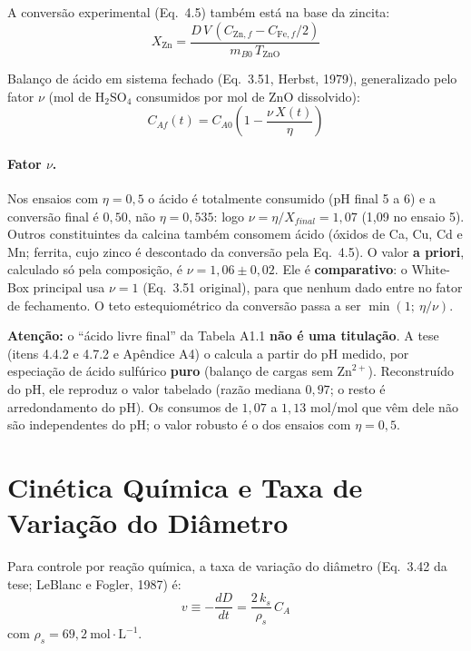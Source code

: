 \documentclass[12pt,a4paper]{article}
\begin{document}
A conversão experimental (Eq.~4.5) também está na base da zincita:
\begin{equation}
    X_{\text{Zn}} = \frac{D \, V \, (C_{\text{Zn},f} - C_{\text{Fe},f}/2)}{m_{B0} \, T_{\text{ZnO}}}
\end{equation}

Balanço de ácido em sistema fechado (Eq.~3.51, Herbst, 1979), generalizado pelo fator $\nu$ (mol de $\text{H}_2\text{SO}_4$ consumidos por mol de ZnO dissolvido):
\begin{equation}
    C_{Af}(t) = C_{A0} \left( 1 - \frac{\nu \, X(t)}{\eta} \right)
    \label{eq:consumo_acido}
\end{equation}

\paragraph{Fator $\nu$.}\label{sec:nu} Nos ensaios com $\eta = 0{,}5$ o ácido é totalmente consumido (pH final 5 a 6) e a conversão final é $0{,}50$, não $\eta = 0{,}535$: logo $\nu = \eta/X_{final} = 1{,}07$ (1,09 no ensaio 5). Outros constituintes da calcina também consomem ácido (óxidos de Ca, Cu, Cd e Mn; ferrita, cujo zinco é descontado da conversão pela Eq.~4.5). O valor \textbf{a priori}, calculado só pela composição, é $\nu = 1{,}06 \pm 0{,}02$. Ele é \textbf{comparativo}: o White-Box principal usa $\nu = 1$ (Eq.~3.51 original), para que nenhum dado entre no fator de fechamento. O teto estequiométrico da conversão passa a ser $\min(1;\ \eta/\nu)$.

\textbf{Atenção:} o ``ácido livre final'' da Tabela A1.1 \textbf{não é uma titulação}. A tese (itens 4.4.2 e 4.7.2 e Apêndice A4) o calcula a partir do pH medido, por especiação de ácido sulfúrico \textbf{puro} (balanço de cargas sem $\text{Zn}^{2+}$). Reconstruído do pH, ele reproduz o valor tabelado (razão mediana $0{,}97$; o resto é arredondamento do pH). Os consumos de $1{,}07$ a $1{,}13$ mol/mol que vêm dele não são independentes do pH; o valor robusto é o dos ensaios com $\eta = 0{,}5$.

\section{Cinética Química e Taxa de Variação do Diâmetro}

Para controle por reação química, a taxa de variação do diâmetro (Eq.~3.42 da tese; LeBlanc e Fogler, 1987) é:
\begin{equation}
    v \equiv -\frac{dD}{dt} = \frac{2 \, k_s}{\rho_s} \, C_A
    \label{eq:v_puro}
\end{equation}
com $\rho_s = 69{,}2\ \text{mol}\cdot\text{L}^{-1}$.
\end{document}
